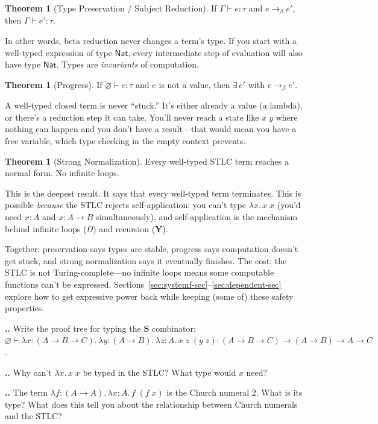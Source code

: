 \documentclass[11pt,a4paper]{article}
\newcounter{exercise}[section]
\renewcommand{\theexercise}{\thesection.\arabic{exercise}}
\theoremstyle{definition}
\newtheorem{theorem}[definition]{Theorem}
\newcommand{\lam}{\lambda}
\newcommand{\reduce}{\longrightarrow_\beta}
\newcommand{\proves}{\vdash}
\newcommand{\church}[1]{\overline{#1}}
\begin{document}
\begin{theorem}[Type Preservation / Subject Reduction]
If\; $\Gamma \proves e : \tau$ \;and\; $e \reduce e'$,\; then\; $\Gamma \proves e' : \tau$.
\end{theorem}

In other words, beta reduction never changes a term's type. If you start with
a well-typed expression of type $\textsf{Nat}$, every intermediate step of
evaluation will also have type $\textsf{Nat}$. Types are \emph{invariants}
of computation.

\begin{theorem}[Progress]
If\; $\varnothing \proves e : \tau$ and $e$ is not a value, then $\exists\, e'$ with $e \reduce e'$.
\end{theorem}

A well-typed closed term is never ``stuck.'' It's either already a value (a
lambda), or there's a reduction step it can take. You'll never reach a state
like $x\;y$ where nothing can happen and you don't have a result---that would
mean you have a free variable, which type checking in the empty context
prevents.

\begin{theorem}[Strong Normalization]
Every well-typed STLC term reaches a normal form. No infinite loops.
\end{theorem}

This is the deepest result. It says that every well-typed term terminates.
This is possible \emph{because} the STLC rejects self-application: you can't
type $\lam x.\, x\;x$ (you'd need $x : A$ and $x : A \to B$ simultaneously),
and self-application is the mechanism behind infinite loops ($\Omega$) and
recursion ($\mathbf{Y}$).

Together: preservation says types are stable, progress says computation doesn't
get stuck, and strong normalization says it eventually finishes. The cost: the
STLC is not Turing-complete---no infinite loops means some computable functions
can't be expressed. Sections~\ref{sec:systemf-sec}--\ref{sec:dependent-sec} explore how to get expressive
power back while keeping (some of) these safety properties.

\begin{exercisebox}
\textbf{\theexercise.}\; Write the proof tree for typing the $\mathbf{S}$ combinator:
$\varnothing \proves \lam x{:}(A \to B \to C).\,\lam y{:}(A \to B).\,\lam z{:}A.\, x\;z\;(y\;z) : (A \to B \to C) \to (A \to B) \to A \to C$.

\textbf{\theexercise.}\; Why can't $\lam x.\, x\;x$ be typed in the STLC? What type would $x$ need?

\textbf{\theexercise.}\; The term $\lam f{:}(A \to A).\, \lam x{:}A.\, f\;(f\;x)$ is the Church numeral $\church{2}$. What is its type? What does this tell you about the relationship between Church numerals and the STLC?
\end{exercisebox}
\end{document}
